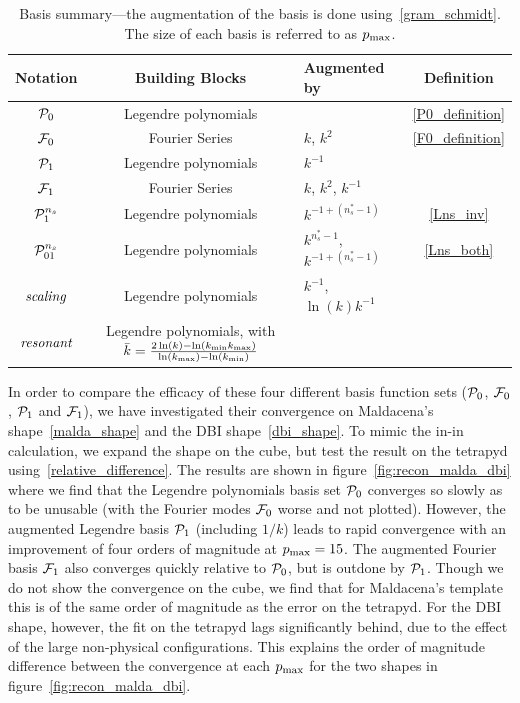 \begin{table}[h!]
  \begin{center}
    \begin{tabular}{c|c|l|c}
      \textbf{Notation} & \textbf{Building Blocks} & \textbf{Augmented by} & \textbf{Definition}\\
      \hline
        $\mathcal{P}_0$  & Legendre polynomials &                & \eqref{P0_definition}\\
        $\mathcal{F}_0$  & Fourier Series & $k$, $k^2$           & \eqref{F0_definition}\\
        $\mathcal{P}_1$   & Legendre polynomials & $k^{-1}$       & \\
        $\mathcal{F}_1$   & Fourier Series & $k$, $k^2$, $k^{-1}$ & \\
        $\mathcal{P}^{n_s}_1$  & Legendre polynomials & $k^{-1+(n_s^{*}-1)}$   & \eqref{Lns_inv}\\
        $\mathcal{P}^{n_s}_{01}$ & Legendre polynomials& $k^{n_s^{*}-1}$, $k^{-1+(n_s^{*}-1)}$ & \eqref{Lns_both}\\
        $\textit{scaling}$ & Legendre polynomials& $k^{-1}$, $\ln(k)k^{-1}$ &\\
        $\textit{resonant}$ & Legendre polynomials, with $\bar{k}=\frac{2\ln(k)-\ln({k_\text{min}}{k_\text{max}})}{\ln({k_\text{max}})-\ln({k_\text{min}})}$& &\\
    \end{tabular}
    \caption{
          Basis summary---the augmentation of the basis is done
          using~\eqref{gram_schmidt}. The size of each basis is
          referred to as $p_\text{max}$.
      }\label{tab:basis_summary}
  \end{center}
\end{table}

In order to compare the efficacy of these four different basis function sets ($\mathcal{P}_0$, $\mathcal{F}_0$, $\mathcal{P}_1$ and $\mathcal{F}_1$), we have investigated their convergence on Maldacena's shape~\eqref{malda_shape} and the DBI shape~\eqref{dbi_shape}.  To mimic the in-in calculation, we expand the shape on the cube, but test the result on the tetrapyd
using~\eqref{relative_difference}.
The results are shown in figure~\ref{fig:recon_malda_dbi} where we find that the Legendre polynomials basis set $\mathcal{P}_0$ converges so slowly as to be unusable (with the Fourier modes $\mathcal{F}_0$ worse and not plotted).
However, the augmented Legendre basis $\mathcal{P}_1$ (including $1/k$) leads to rapid convergence with an improvement of four orders
of magnitude at $p_\text{max}=15$. The augmented Fourier basis $\mathcal{F}_1$ also converges
quickly relative to $\mathcal{P}_0$, but is outdone by $\mathcal{P}_1$.
Though we do not show the convergence on the cube, we find that for Maldacena's
template this is of the same order of magnitude as
the error on the tetrapyd.  For the DBI shape, however, the
fit on the tetrapyd lags significantly behind, due to the effect
of the large non-physical configurations. This explains the order of
magnitude difference between the convergence at
each $p_\text{max}$ for the two shapes in figure~\ref{fig:recon_malda_dbi}.


